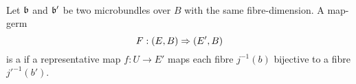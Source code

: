  \\
Let $\mathfrak{b}$ and $\mathfrak{b}'$ be two microbundles over $B$ with the same fibre-dimension.
A map-germ
\[ F: (E, B) \Rightarrow (E', B) \]
is a  if a representative map $f: U \to E'$ maps each fibre $j^{-1}(b)$ bijective to a fibre $j'^{-1}(b')$.